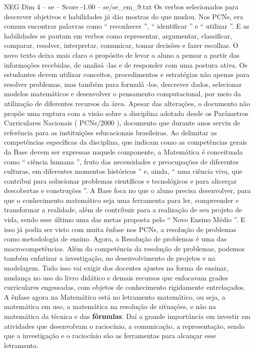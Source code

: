 \begin{textsample}{NEG Dim 4 – se – Score -1.00 – se/se\_em\_9.txt}
Os verbos selecionados para descrever objetivos e habilidades já dão mostras do que mudou.
Nos PCNs, era comum encontrar palavras como “ reconhecer ”, “ identificar ” e “ utilizar ”.
E as habilidades se pautam em verbos como representar, argumentar, classificar, comparar, resolver, interpretar, comunicar, tomar decisões e fazer escolhas.
O novo texto deixa mais claro o propósito de levar o aluno a pensar a partir das informações recebidas, de analisá -las e de responder com uma postura ativa.
Os estudantes devem utilizar conceitos, procedimentos e estratégias não apenas para resolver problemas, mas também para formulá -los, descrever dados, selecionar modelos matemáticos e desenvolver o pensamento computacional, por meio da utilização de diferentes recursos da área.
Apesar das alterações, o documento não propõe uma ruptura com a visão sobre a disciplina adotada desde os Parâmetros Curriculares Nacionais ( PCNs/2000 ), documento que durante anos serviu de referência para as instituições educacionais brasileiras.
Ao delimitar as competências específicas da disciplina, que indicam como as competências gerais da Base devem ser expressas naquele componente, a Matemática é conceituada como “ ciência humana ”, fruto das necessidades e preocupações de diferentes culturas, em diferentes momentos históricos ” e, ainda, “ uma ciência viva, que contribui para solucionar problemas científicos e tecnológicos e para alicerçar descobertas e construções ”.
A Base foca no que o aluno precisa desenvolver, para que o conhecimento matemático seja uma ferramenta para ler, compreender e transformar a realidade, além de contribuir para a realização de seu projeto de vida, sendo esse último uma das metas proposta pelo “ Novo Ensino Médio ”.
E isso já podia ser visto com muita ênfase nos PCNs, a resolução de problemas como metodologia de ensino.
Agora, a Resolução de problemas é uma das macrocompetências.
Além da competência da resolução de problemas, podemos também enfatizar a investigação, no desenvolvimento de projetos e na modelagem.
Tudo isso vai exigir dos docentes ajustes na forma de ensinar, mudança no uso do livro didático e demais recursos que enfocavam grades curriculares engessadas, com objetos de conhecimento rigidamente entrelaçados.
A ênfase agora na Matemática está no letramento matemático, ou seja, a matemática em uso, a matemática na resolução de situações, e não na matemática da técnica e das \textbf{fórmulas}.
Daí a grande importância em investir em atividades que desenvolvam o raciocínio, a comunicação, a representação, sendo que a investigação e o raciocínio são as ferramentas para alcançar esse letramento.

\end{textsample}
